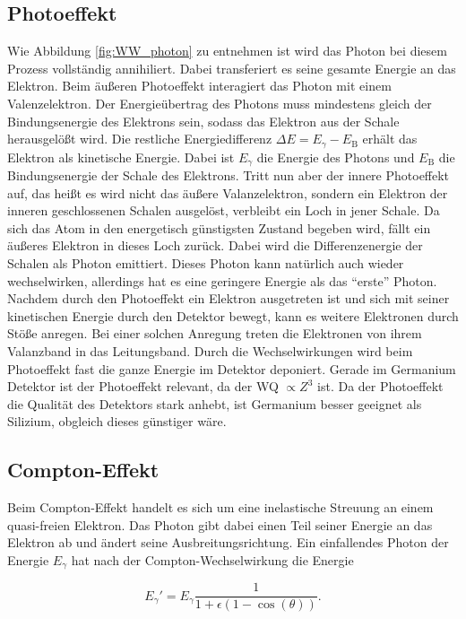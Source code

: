 \subsection{Photoeffekt}
\label{subsec:photoeffekt}
Wie Abbildung \ref{fig:WW_photon} zu entnehmen ist wird das Photon bei diesem Prozess vollständig annihiliert. Dabei transferiert es seine gesamte Energie an das Elektron.
Beim äußeren Photoeffekt interagiert das Photon mit einem Valenzelektron. Der Energieübertrag des Photons muss mindestens gleich der Bindungsenergie des Elektrons sein, sodass 
das Elektron aus der Schale herausgelößt wird. Die restliche Energiedifferenz $\Delta E = E_{\gamma} - E_{\mathrm{B}}$ erhält das Elektron als kinetische Energie. Dabei ist 
$E_{\gamma}$ die Energie des Photons und $E_{\mathrm{B}}$ die Bindungsenergie der Schale des Elektrons. Tritt nun aber der innere Photoeffekt auf, das heißt es wird nicht das 
äußere Valanzelektron, sondern ein Elektron der inneren geschlossenen Schalen ausgelöst, verbleibt ein Loch in jener Schale. Da sich das Atom in den energetisch günstigsten 
Zustand begeben wird, fällt ein äußeres Elektron in dieses Loch zurück. Dabei wird die Differenzenergie der Schalen als Photon emittiert. Dieses Photon kann natürlich auch 
wieder wechselwirken, allerdings hat es eine geringere Energie als das \enquote{erste} Photon. Nachdem durch den Photoeffekt ein Elektron ausgetreten ist und sich mit seiner
kinetischen Energie durch den Detektor bewegt, kann es weitere Elektronen durch Stöße anregen. Bei einer solchen Anregung treten die Elektronen von ihrem Valanzband in das 
Leitungsband. Durch die Wechselwirkungen wird beim Photoeffekt fast die ganze Energie im Detektor deponiert. Gerade im Germanium Detektor ist der Photoeffekt relevant, da der WQ
$\propto Z^3$ ist. Da der Photoeffekt die Qualität des Detektors stark anhebt, ist Germanium besser geeignet als Silizium, obgleich dieses günstiger wäre.

\subsection{Compton-Effekt}
\label{subsec:comptoneffekt}
Beim Compton-Effekt handelt es sich um eine inelastische Streuung an einem quasi-freien Elektron. Das Photon gibt dabei einen Teil seiner Energie an das Elektron ab und ändert 
seine Ausbreitungsrichtung. Ein einfallendes Photon der Energie $E_{\gamma}$ hat nach der Compton-Wechselwirkung die Energie 

\begin{equation}
    \label{eqn:E_compton}
    E_{\gamma}' = E_{\gamma}\frac{1}{1+\epsilon(1-\cos(\theta))}.
\end{equation}

